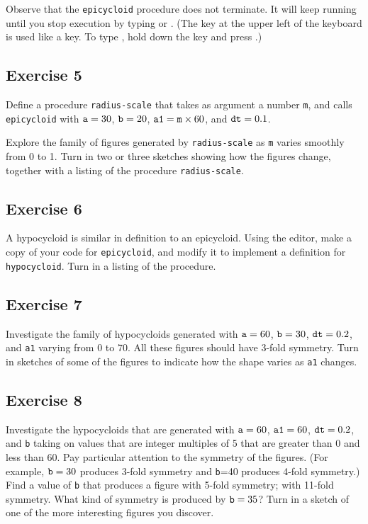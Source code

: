 Observe that the {\tt epicycloid} procedure does not terminate.  It
will keep running until you stop execution by typing \ctrl{} or
.  (The  key at the upper left of the keyboard is
used like a  key.  To type \ctrl{}, hold down the
 key and press .)

\subsection{Exercise 5}

Define a procedure {\tt radius-scale} that takes as argument a number
{\tt m}, and calls {\tt epicycloid} with ${\tt a}=30$, ${\tt b}=20$,
${\tt a1}={\tt m}\times 60$, and ${\tt dt}=0.1$.

Explore the family of figures generated by {\tt radius-scale} as {\tt m}
varies smoothly from 0 to 1. Turn in two or three sketches showing how
the figures change, together with a listing of the procedure
{\tt radius-scale}.

\subsection{Exercise 6}

A hypocycloid is similar in definition to an
epicycloid.  Using the editor, make a copy of your code for
{\tt epicycloid}, and modify it to implement a definition for
{\tt hypocycloid}.  Turn in a listing of the procedure.

\subsection{Exercise 7}

Investigate the family of hypocycloids generated with ${\tt a}=60$,
${\tt b}=30$, ${\tt dt}=0.2$, and
{\tt a1} varying from 0 to 70. All these figures should have 3-fold
symmetry. Turn in sketches of some of the figures to indicate how
the shape varies as {\tt a1} changes.

\subsection{Exercise 8}

Investigate the hypocycloids that are generated with ${\tt a}=60$,
${\tt a1}=60$, ${\tt dt}=0.2$, and {\tt b} taking on values that are integer
multiples of 5 that are greater than 0 and less than 60.  Pay
particular attention to the symmetry of the figures.  (For example,
${\tt b}=30$ produces 3-fold symmetry and {\tt b}=40 produces 4-fold
symmetry.)  Find a value of {\tt b} that produces a figure with 5-fold
symmetry; with 11-fold symmetry.  What kind of symmetry is produced by
${\tt b}=35$?  Turn in a sketch of one of the more interesting figures
you discover.

